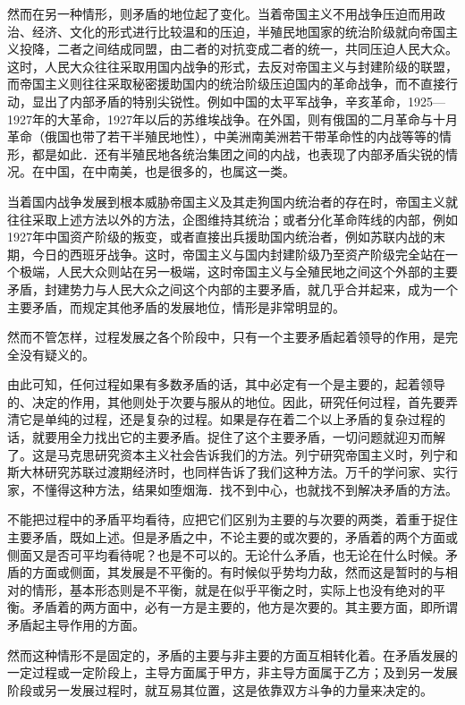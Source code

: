 \documentclass[UTF8, 12pt, a4paper]{ctexrep}
\begin{document}
然而在另一种情形，则矛盾的地位起了变化。当着帝国主义不用战争压迫而用政治、经济、文化的形式进行比较温和的压迫，半殖民地国家的统治阶级就向帝国主义投降，二者之间结成同盟，由二者的对抗变成二者的统一，共同压迫人民大众。这时，人民大众往往采取用国内战争的形式，去反对帝国主义与封建阶级的联盟，而帝国主义则往往采取秘密援助国内的统治阶级压迫国内的革命战争，而不直接行动，显出了内部矛盾的特别尖锐性。例如中国的太平军战争，辛亥革命，1925—1927年的大革命，1927年以后的苏维埃战争。在外国，则有俄国的二月革命与十月革命（俄国也带了若干半殖民地性），中美洲南美洲若干带革命性的内战等等的情形，都是如此．还有半殖民地各统治集团之间的内战，也表现了内部矛盾尖锐的情况。在中国，在中南美，也是很多的，也属这一类。

当着国内战争发展到根本威胁帝国主义及其走狗国内统治者的存在时，帝国主义就往往采取上述方法以外的方法，企图维持其统治；或者分化革命阵线的内部，例如1927年中国资产阶级的叛变，或者直接出兵援助国内统治者，例如苏联内战的末期，今日的西班牙战争。这时，帝国主义与国内封建阶级乃至资产阶级完全站在一个极端，人民大众则站在另一极端，这时帝国主义与全殖民地之间这个外部的主要矛盾，封建势力与人民大众之间这个内部的主要矛盾，就几乎合并起来，成为一个主要矛盾，而规定其他矛盾的发展地位，情形是非常明显的。

然而不管怎样，过程发展之各个阶段中，只有一个主要矛盾起着领导的作用，是完全没有疑义的。

由此可知，任何过程如果有多数矛盾的话，其中必定有一个是主要的，起着领导的、决定的作用，其他则处于次要与服从的地位。因此，研究任何过程，首先要弄清它是单纯的过程，还是复杂的过程。如果是存在着二个以上矛盾的复杂过程的话，就要用全力找出它的主要矛盾。捉住了这个主要矛盾，一切问题就迎刃而解了。这是马克思研究资本主义社会告诉我们的方法。列宁研究帝国主义时，列宁和斯大林研究苏联过渡期经济时，也同样告诉了我们这种方法。万千的学问家、实行家，不懂得这种方法，结果如堕烟海．找不到中心，也就找不到解决矛盾的方法。

不能把过程中的矛盾平均看待，应把它们区别为主要的与次要的两类，着重于捉住主要矛盾，既如上述。但是矛盾之中，不论主要的或次要的，矛盾着的两个方面或侧面又是否可平均看待呢？也是不可以的。无论什么矛盾，也无论在什么时候。矛盾的方面或侧面，其发展是不平衡的。有时候似乎势均力敌，然而这是暂时的与相对的情形，基本形态则是不平衡，就是在似乎平衡之时，实际上也没有绝对的平衡。矛盾着的两方面中，必有一方是主要的，他方是次要的。其主要方面，即所谓矛盾起主导作用的方面。

然而这种情形不是固定的，矛盾的主要与非主要的方面互相转化着。在矛盾发展的一定过程或一定阶段上，主导方面属于甲方，非主导方面属于乙方；及到另一发展阶段或另一发展过程时，就互易其位置，这是依靠双方斗争的力量来决定的。
\end{document}
